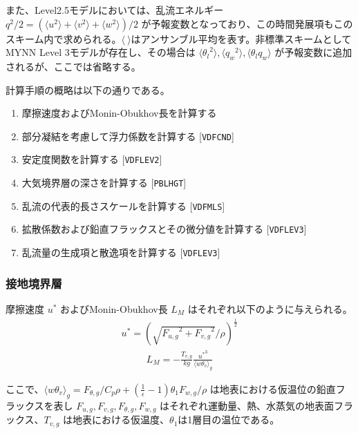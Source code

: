 また、Level2.5モデルにおいては、乱流エネルギー
\(q^2/2=(\langle u^2 \rangle + \langle v^2 \rangle + \langle w^2 \rangle)/2\)
が予報変数となっており、この時間発展項もこのスキーム内で求められる。\(\langle \ \rangle\)はアンサンブル平均を表す。非標準スキームとしてMYNN
Level 3モデルが存在し、その場合は
\(\langle {\theta_l}^2 \rangle,\langle {q_w}^2 \rangle,\langle \theta_l q_w \rangle\)
が予報変数に追加されるが、ここでは省略する。

計算手順の概略は以下の通りである。

\begin{enumerate}
\def\labelenumi{\arabic{enumi}.}
\tightlist
\item
  摩擦速度およびMonin-Obukhov長を計算する
\item
  部分凝結を考慮して浮力係数を計算する {[}\texttt{VDFCND}{]}
\item
  安定度関数を計算する {[}\texttt{VDFLEV2}{]}
\item
  大気境界層の深さを計算する {[}\texttt{PBLHGT}{]}
\item
  乱流の代表的長さスケールを計算する {[}\texttt{VDFMLS}{]}
\item
  拡散係数および鉛直フラックスとその微分値を計算する
  {[}\texttt{VDFLEV3}{]}
\item
  乱流量の生成項と散逸項を計算する {[}\texttt{VDFLEV3}{]}
\end{enumerate}

\hypertarget{ux63a5ux5730ux5883ux754cux5c64}{%
\subsubsection{接地境界層}\label{ux63a5ux5730ux5883ux754cux5c64}}

摩擦速度 \(u^*\) およびMonin-Obukhov長 \(L_M\)
はそれぞれ以下のように与えられる。
\begin{eqnarray}u^*=\left(\sqrt{{F_{u,g}}^2+{F_{v,g}}^2}/\rho \right)^\frac{1}{2}\end{eqnarray}
\begin{eqnarray}L_M=-\frac{T_{v,g}}{kg}\frac{{u^*}^3}{\langle w\theta_v \rangle_g}\end{eqnarray}

ここで、\(\langle w\theta_v \rangle_g=F_{\theta,g}/C_p\rho +\left(\frac{1}{\epsilon}-1\right)\theta_1 F_{w,g}/\rho\)
は地表における仮温位の鉛直フラックスを表し
\(F_{u,g},F_{v,g},F_{\theta,g},F_{w,g}\)
はそれぞれ運動量、熱、水蒸気の地表面フラックス、\(T_{v,g}\)
は地表における仮温度、\(\theta_1\)は1層目の温位である。

